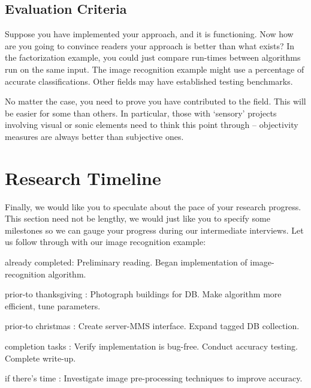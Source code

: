 \documentclass{sig-alternate}
\begin{document}
\subsection{Evaluation Criteria}
\label{subsec:eval_criteria}
Suppose you have implemented your approach, and it is functioning. Now how are you going to convince readers your approach is better than what exists? In the factorization example, you could just compare run-times between algorithms run on the same input. The image recognition example might use a percentage of accurate classifications. Other fields may have established testing benchmarks.

No matter the case, you need to prove you have contributed to the field. This will be easier for some than others. In particular, those with `sensory' projects involving visual or sonic elements need to think this point through -- objectivity measures are always better than subjective ones.

\section{Research Timeline}
\label{sec:research_timeline}
Finally, we would like you to speculate about the pace of your research progress. This section need not be lengthy, we would just like you to specify some milestones so we can gauge your progress during our intermediate interviews. Let us follow through with our image recognition example:

\begin{itemize*}
	\item {\sc already completed}: Preliminary reading. Began implementation of image-recognition algorithm.\vspace{3pt}
	\item {\sc prior-to thanksgiving} : Photograph buildings for DB. Make algorithm more efficient, tune parameters.\vspace{3pt}
	\item {\sc prior-to christmas} : Create server-MMS interface. Expand tagged DB collection.\vspace{3pt}
	\item {\sc completion tasks} : Verify implementation is bug-free. Conduct accuracy testing. Complete write-up.\vspace{3pt}
	\item {\sc if there's time} : Investigate image pre-processing techniques to improve accuracy.
\end{itemize*}
\end{document}
